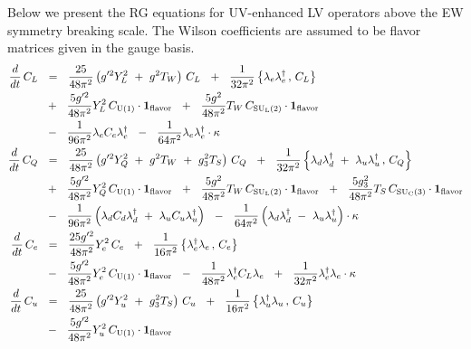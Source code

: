 \documentclass[12pt,preprintnumbers,nofootinbib]{revtex4}
\newcommand{\suc}{{{\rm SU}_{\rm C}(3)}}
\newcommand{\sul}{{{\rm SU}_{\rm L}(2)}}
\newcommand{\ue}{{{\rm U}(1)}}
\newcommand{\uflavor}{\mathbf{1}_{\rm flavor}}
\begin{document}
	Below we present the RG equations for UV-enhanced LV operators above the EW
	symmetry breaking scale. 
	The Wilson coefficients are assumed to be flavor matrices given in the gauge basis.
\begin{align}
\label{RG_above_ferm}
\notag
	\frac{d}{dt}\, 
	C_L
	&
	~~=~~
	\frac{25}{48\pi^2}
	\left(
		g'^2 Y_L^2  ~+~
		g^2 T_W 
	\right)\, C_L 
	~~+~~
	\frac{1}{32\pi^2} 
		\left\{ \lambda_e\lambda_e^\dag\,,\, C_L \right\}
	\\
\notag
	&
	~~+~~
	\frac{5 g'^2}{48\pi^2}  Y_L^2\, C_\ue \cdot \uflavor
	~~+~~
	\frac{5 g^2}{48\pi^2} T_W\, C_\sul \cdot \uflavor
	\\
\notag 
	&
	~~-~~
	\frac{1}{96\pi^2} \lambda_e C_e \lambda_e^\dag 
	~~-~~
	\frac{1}{64\pi^2} \lambda_e \lambda_e^\dag \cdot \kappa
	\\
\notag
	\frac{d}{dt}\, 
	C_Q
	&
	~~=~~
	\frac{25}{48\pi^2}
	\left(
		g'^2 Y_Q^2 ~+~
		g^2 T_W ~+~
		g_3^2 T_S
	\right)\,
	C_Q
	~~+~~
	\frac{1}{32\pi^2} 
	\left\{ \lambda_d \lambda_d^\dag ~+~
		\lambda_u \lambda_u^\dag \,,\,
		C_Q 
	\right\}
	\\
\notag
	&
	~~+~~
	\frac{5 g'^2}{48\pi^2} Y_Q^2\, C_\ue \cdot \uflavor 
	~~+~~ 
	\frac{5 g^2}{48\pi^2} T_W\, C_\sul \cdot \uflavor 
	~~+~~
	\frac{5 g_3^2}{48\pi^2} T_S\, C_\suc \cdot \uflavor
	\\
\notag
	&
	~~-~~
	\frac{1}{96\pi^2}
	\left( \lambda_d C_d \lambda_d^\dag ~+~
		\lambda_u C_u \lambda_u^\dag 
	\right)
	~~-~~
	\frac{1}{64\pi^2}
	\left( \lambda_d \lambda_d^\dag ~-~
		\lambda_u \lambda_u^\dag 
	\right) \cdot
	\kappa
	\\
	\frac{d}{dt}\, 
	C_e
	&
	~~=~~
	\frac{25 g'^2}{48\pi^2} Y_e^2\, C_e
	~~+~~
	\frac{1}{16\pi^2} 
	\left\{ \lambda_e^\dag \lambda_e \,,\,
		C_e 
	\right\}
	\\
\notag
	&
	~~-~~
	\frac{5 g'^2}{48\pi^2} Y_e^2\, C_\ue \cdot \uflavor
	~~-~~
	\frac{1}{48\pi^2} \lambda_e^\dag C_L \lambda_e
	~~+~~
	\frac{1}{32\pi^2} \lambda_e^\dag \lambda_e \cdot
	\kappa
	\\
\notag
	\frac{d}{dt}\, 
	C_u
	&
	~~=~~
	\frac{25}{48\pi^2} 
	\left(
	g'^2 Y_u^2 ~+~ g_3^2 T_S 
	\right)\, C_u
	~~+~~
	\frac{1}{16\pi^2} 
	\left\{ \lambda_u^\dag \lambda_u \,,\, C_u 
	\right\}
	\\
\notag
	&
	~~-~~
	\frac{5 g'^2}{48\pi^2} Y_u^2\, C_\ue \cdot \uflavor

\end{align}
\end{document}
